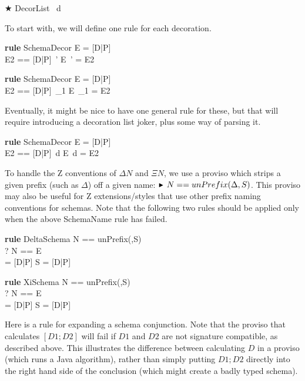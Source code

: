 \documentclass{article}
\newenvironment{zedrule}[1]{\par\textbf{rule }#1\vspace{-2ex}\infrule}{\endinfrule}
\newcommand{\derives}{\derive{}}
\newenvironment{zedjoker}[1]{\par$\bigstar$ #1\ }{}
\newcommand{\proviso}{\raisebox{0.5ex}{${}_{\blacktriangleright}\ $}}%
\begin{document}
\begin{zedjoker}{DecorList} d \end{zedjoker}

To start with, we will define one rule for each decoration.

\begin{zedrule}{SchemaDecor}
  E = [D|P] \\
  \proviso E2 == [D|P]~'
\derives
  E~' = E2
\end{zedrule}

\begin{zedrule}{SchemaDecor}
  E = [D|P] \\
  \proviso E2 == [D|P]~\_1
\derives
  E~\_1 = E2
\end{zedrule}

Eventually, it might be nice to have one general
rule for these, but that will require introducing
a decoration list joker, plus some way of parsing
it.
\begin{zedrule}{SchemaDecor}
  E = [D|P] \\
  \proviso E2 == [D|P]~d
\derives
  E~d = E2
\end{zedrule}

To handle the Z conventions of $\Delta N$ and $\Xi N$,
we use a proviso which strips a given prefix (such as $\Delta$)
off a given name: $\proviso N == unPrefix(\Delta,S)$.
This proviso may also be useful for Z extensions/styles that use
other prefix naming conventions for schemas.
Note that the following two rules should be applied
only when the above SchemaName rule has failed.

\begin{zedrule}{DeltaSchema}
  \proviso N == unPrefix(\Delta,S) \\
  \proviso? N == E \\
  [E; E~'] = [D|P]
\derives
  S = [D|P]
\end{zedrule}

\begin{zedrule}{XiSchema}
  \proviso N == unPrefix(\Xi,S) \\
  \proviso? N == E \\
  [E; E~'| \theta E = \theta E~'] = [D|P]
\derives
  S = [D|P]
\end{zedrule}

 
Here is a rule for expanding a schema conjunction.
Note that the proviso that calculates $[D1;D2]$ will fail
if $D1$ and $D2$ are not signature compatible, as described above.
This illustrates the difference between calculating $D$ in
a proviso (which runs a Java algorithm), rather than simply
putting $D1;D2$ directly into the right hand side of the
conclusion (which might create a badly typed schema).
\end{document}
